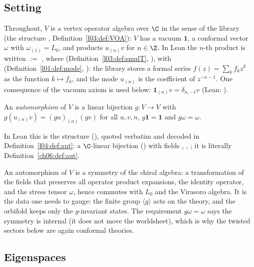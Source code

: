 \subsection{Setting}

Throughout, $V$ is a vertex operator algebra over $\C$ in the sense of the library (the structure
, Definition~\ref{l03:def:VOA}): $V$ has a vacuum $\mathbf 1$, a conformal
vector $\omega$ with $\omega_{(1)}=L_0$, and products $u_{(n)}v$ for $n\in\Z$.  In Lean the $n$-th
product is written  $:=$ , where
 (Definition~\ref{l03:def:smulT},
), with 
(Definition~\ref{l01:def:mode}, ): the library
stores a formal series $f(z)=\sum_k f_k z^{k}$ as the function $k\mapsto f_k$, and the mode
$u_{(n)}$ is the coefficient of $z^{-n-1}$.  One consequence of the vacuum axiom is used below:
$\mathbf 1_{(n)}v=\delta_{n,-1}v$ (Lean: ).

\begin{definition}[Automorphism]\label{ch06:def:aut}
An \emph{automorphism} of $V$ is a linear bijection $g:V\to V$ with $g(u_{(n)}v)=(gu)_{(n)}(gv)$
for all $u,v,n$, $g\mathbf 1=\mathbf 1$ and $g\omega=\omega$.
\end{definition}
In Lean this is the structure  (), quoted
verbatim and decoded in Definition~\ref{l04:def:aut}: a $\C$-linear bijection 
() with fields , , ; it is literally
Definition~\ref{ch06:def:aut}.

\begin{physics}
An automorphism of $V$ is a symmetry of the chiral algebra: a transformation of the fields that preserves all operator product expansions, the identity operator, and the stress tensor $\omega$, hence commutes with $L_0$ and the Virasoro algebra. It is the data one needs to gauge: the finite group $\langle g\rangle$ acts on the theory, and the orbifold keeps only the $g$-invariant states. The requirement $g\omega=\omega$ says the symmetry is internal (it does not move the worldsheet), which is why the twisted sectors below are again conformal theories.
\end{physics}

\subsection{Eigenspaces}

